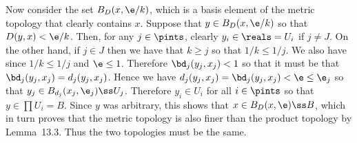 {{    Now consider the set $B_D(x,\e/k)$, which is a basis element of the metric topology that clearly contains $x$.
    Suppose that $y \in B_D(x,\e/k)$ so that $D(y,x) < \e/k$.
    Then, for any $j \in \pints$, clearly $y_i \in \reals = U_i$ if $j \neq J$.
    On the other hand, if $j \in J$ then we have that $k \geq j$ so that $1/k \leq 1/j$.
    We also have
    since $1/k \leq 1/j$ and $\e \leq 1$.
    Therefore $\bd_j(y_j,x_j) < 1$ so that it must be that $\bd_j(y_j,x_j) = d_j(y_j,x_j)$.
    Hence we have $d_j(y_j,x_j) = \bd_j(y_j,x_j) < \e \leq \e_j$ so that $y_j \in B_{d_j}(x_j,\e_j) \ss U_j$.
    Therefore $y_i \in U_i$ for all $i \in \pints$ so that $y \in \prod U_i = B$.
    Since $y$ was arbitrary, this shows that $x \in B_D(x,\e) \ss B$, which in turn proves that the metric topology is also finer than the product topology by Lemma~13.3.
    Thus the two topologies must be the same.
  }
}

